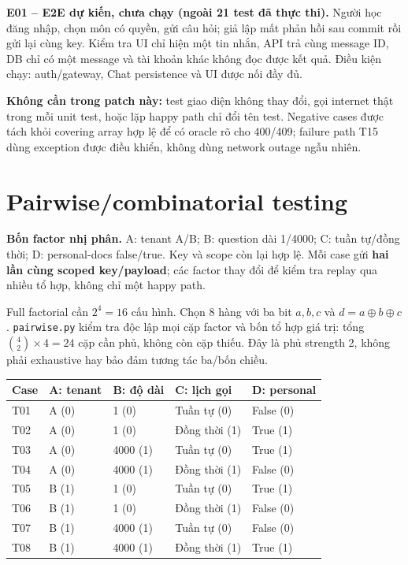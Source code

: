 \documentclass[11pt,a4paper]{article}
\DeclareRobustCommand{\code}[1]{\nolinkurl{#1}}
\begin{document}
\textbf{E01 -- E2E dự kiến, chưa chạy (ngoài 21 test đã thực thi).} Người học đăng nhập, chọn môn có quyền, gửi câu hỏi; giả lập mất phản hồi sau commit rồi gửi lại cùng key. Kiểm tra UI chỉ hiện một tin nhắn, API trả cùng message ID, DB chỉ có một message và tài khoản khác không đọc được kết quả. Điều kiện chạy: auth/gateway, Chat persistence và UI được nối đầy đủ.

\textbf{Không cần trong patch này:} test giao diện không thay đổi, gọi internet thật trong mỗi unit test, hoặc lặp happy path chỉ đổi tên test. Negative cases được tách khỏi covering array hợp lệ để có oracle rõ cho 400/409; failure path T15 dùng exception được điều khiển, không dùng network outage ngẫu nhiên.

\newpage
\section{Pairwise/combinatorial testing}
\textbf{Bốn factor nhị phân.} A: tenant A/B; B: question dài 1/4000; C: tuần tự/đồng thời; D: personal-docs false/true. Key và scope còn lại hợp lệ. Mỗi case gửi \textbf{hai lần cùng scoped key/payload}; các factor thay đổi để kiểm tra replay qua nhiều tổ hợp, không chỉ một happy path.

Full factorial cần $2^4=16$ cấu hình. Chọn 8 hàng với ba bit $a,b,c$ và $d=a\oplus b\oplus c$. \code{pairwise.py} kiểm tra độc lập mọi cặp factor và bốn tổ hợp giá trị: tổng $\binom42\times4=24$ cặp cần phủ, không còn cặp thiếu. Đây là phủ strength 2, không phải exhaustive hay bảo đảm tương tác ba/bốn chiều.

\begin{center}
\begin{tabular}{@{}L{12mm}C{24mm}C{30mm}C{29mm}C{31mm}@{}}
\toprule
\textbf{Case} & \textbf{A: tenant} & \textbf{B: độ dài} & \textbf{C: lịch gọi} & \textbf{D: personal}\\\midrule
T01 & A (0) & 1 (0) & Tuần tự (0) & False (0)\\
T02 & A (0) & 1 (0) & Đồng thời (1) & True (1)\\
T03 & A (0) & 4000 (1) & Tuần tự (0) & True (1)\\
T04 & A (0) & 4000 (1) & Đồng thời (1) & False (0)\\
T05 & B (1) & 1 (0) & Tuần tự (0) & True (1)\\
T06 & B (1) & 1 (0) & Đồng thời (1) & False (0)\\
T07 & B (1) & 4000 (1) & Tuần tự (0) & False (0)\\
T08 & B (1) & 4000 (1) & Đồng thời (1) & True (1)\\
\bottomrule
\end{tabular}
\end{center}
\end{document}
